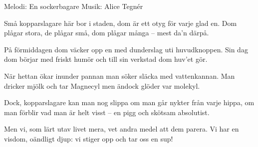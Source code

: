 \begin{song}

\begin{songmeta}
Melodi: En sockerbagare
Musik: Alice Tegnér
\end{songmeta}

\begin{songtext}
Små kopparslagare här bor i staden,
dom är ett otyg för varje glad en.
Dom plågar stora, de plågar små,
dom plågar många -- mest da'n därpå.

På förmiddagen dom väcker opp en
med dunderslag uti huvudknoppen.
Sin dag dom börjar med friskt humör
och till sin verkstad dom huv'et gör.

När hettan ökar inunder pannan
man söker släcka med vattenkannan.
Man dricker mjölk och tar Magnecyl
men ändock glöder var molekyl.

Dock, kopparslagare kan man nog slippa
om man går nykter från varje hippa,
om man förblir vad man är helt visst
-- en pigg och skötsam absolutist.

Men vi, som lärt utav livet mera,
vet andra medel att dem parera.
Vi har en visdom, oändligt djup:
vi stiger opp och tar oss en sup!
\end{songtext}
\end{song}
